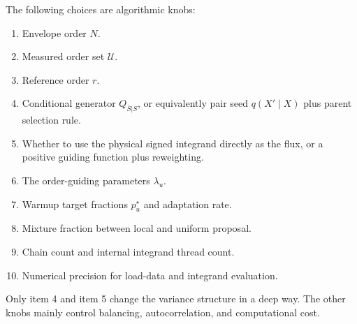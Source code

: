 \documentclass[11pt]{article}
\newcommand{\1}{\mathbf{1}}
\newcommand{\calU}{\mathcal{U}}
\begin{document}
The following choices are algorithmic knobs:
\begin{enumerate}[leftmargin=2em]
  \item Envelope order \(N\).
  \item Measured order set \(\calU\).
  \item Reference order \(r\).
  \item Conditional generator \(Q_{\bar S|S}\), or equivalently pair seed
  \(q(X'\mid X)\) plus parent selection rule.
  \item Whether to use the physical signed integrand directly as the flux, or
  a positive guiding function plus reweighting.
  \item The order-guiding parameters \(\lambda_u\).
  \item Warmup target fractions \(p_u^\star\) and adaptation rate.
  \item Mixture fraction between local and uniform proposal.
  \item Chain count and internal integrand thread count.
  \item Numerical precision for load-data and integrand evaluation.
\end{enumerate}

Only item 4 and item 5 change the variance structure in a deep way.  The
other knobs mainly control balancing, autocorrelation, and computational cost.
\end{document}
